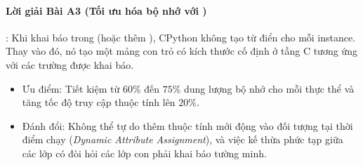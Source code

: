 \paragraph{Lời giải Bài A3 (Tối ưu hóa bộ nhớ với )}:
Khi khai báo  trong  (hoặc thêm ), CPython không tạo từ điển  cho mỗi instance. Thay vào đó, nó tạo một mảng con trỏ có kích thước cố định ở tầng C tương ứng với các trường được khai báo. 
\begin{itemize}
  \item Ưu điểm: Tiết kiệm từ $60\%$ đến $75\%$ dung lượng bộ nhớ cho mỗi thực thể và tăng tốc độ truy cập thuộc tính lên $20\%$.
  \item Đánh đổi: Không thể tự do thêm thuộc tính mới động vào đối tượng tại thời điểm chạy (\textit{Dynamic Attribute Assignment}), và việc kế thừa phức tạp giữa các lớp có  đòi hỏi các lớp con phải khai báo tường minh.
\end{itemize}

